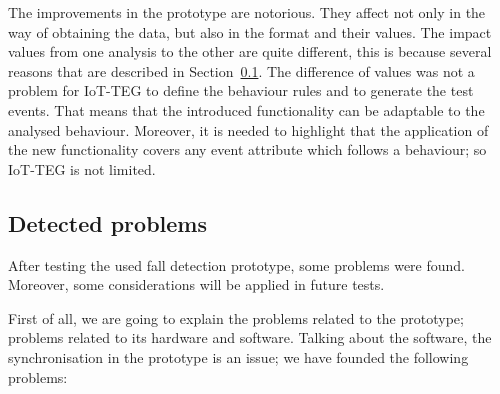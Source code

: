 \documentclass[review]{elsarticle}
\begin{document}
The improvements in the prototype are notorious. They affect not only in the way of obtaining the data, but 
also in the format and their values. The impact values from one analysis to the other are quite different, 
this is because several reasons that are described in Section~\ref{sub:detectedproblems}. The difference
of values was not a problem for IoT-TEG to define the behaviour rules and to generate the test events. That
means that the introduced functionality can be adaptable to the analysed behaviour. Moreover, it is needed 
to highlight that the application of the new functionality covers any event attribute which follows a behaviour;
so IoT-TEG is not limited.

\subsection{Detected problems}
\label{sub:detectedproblems}

After testing the used fall detection prototype, some problems were 
found. Moreover, some considerations will be applied in future tests.

First of all, we are going to explain the problems related to the prototype; problems related to its hardware and
software. Talking about the software, the synchronisation in the prototype is an issue; we have founded the following problems:
\end{document}
